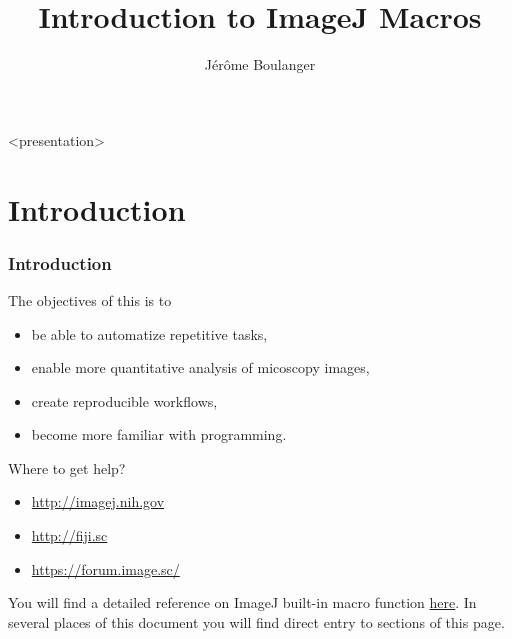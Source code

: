 \newcommand{\kw}[1]{\textcolor{orange}{\textbf{#1}}}
\newcommand{\code}[1] {\textcolor{gray}{\texttt{#1}}}
\setcounter{tocdepth}{1}
\title{Introduction to ImageJ Macros}
\author{J\'er\^ome Boulanger}
\date{}

\begin{frame}
  \maketitle
\end{frame}

\begin{frame}<presentation>
  \tiny \tableofcontents
\end{frame}

\section{Introduction}
\begin{frame}
  \frametitle<presentation>{Introduction}
  The objectives of this  is to
  \begin{itemize}
    \item be able to automatize repetitive tasks,
    \item enable more quantitative analysis of micoscopy images,
    \item create reproducible workflows,
    \item become more familiar with programming.
  \end{itemize}
  Where to get help?
  \begin{itemize}
    \item \url{http://imagej.nih.gov}
    \item \url{http://fiji.sc}
    \item \url{https://forum.image.sc/}
  \end{itemize}
\end{frame}

You will find a detailed reference on ImageJ built-in macro function
\href{http://rsb.info.nih.gov/ij/developer/macro/functions.html}{here}. In
several places of this document you will find direct entry to sections
of this page.

